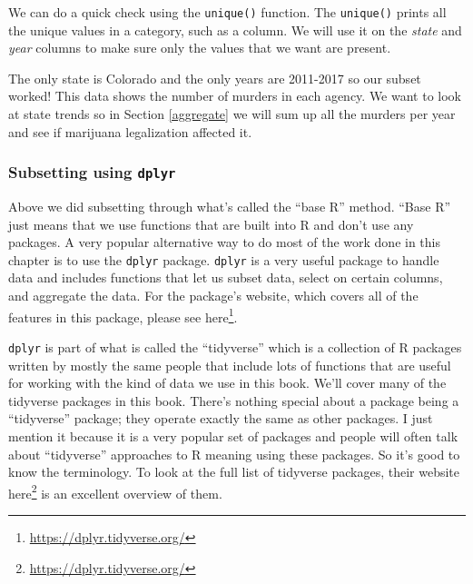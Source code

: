 \documentclass[
]{krantz}
\makeatletter
\newenvironment{Shaded}{\begin{snugshade}}{\end{snugshade}}
\newcommand{\CommentTok}[1]{\textcolor[rgb]{0.37,0.37,0.37}{\textit{#1}}}
\newcommand{\FunctionTok}[1]{\textcolor[rgb]{0,0,0}{#1}}
\newcommand{\NormalTok}[1]{#1}
\newcommand{\SpecialCharTok}[1]{\textcolor[rgb]{0,0,0}{#1}}
\renewcommand{\href}[2]{#2\footnote{\url{#1}}}
\newenvironment{kframe}{%
\medskip{}
\setlength{\fboxsep}{.8em}
 \def\at@end@of@kframe{}%
 \ifinner\ifhmode%
  \def\at@end@of@kframe{\end{minipage}}%
  \begin{minipage}{\columnwidth}%
 \fi\fi%
 \def\FrameCommand##1{\hskip\@totalleftmargin \hskip-\fboxsep
 \colorbox{shadecolor}{##1}\hskip-\fboxsep
     \hskip-\linewidth \hskip-\@totalleftmargin \hskip\columnwidth}%
 \MakeFramed {\advance\hsize-\width
   \@totalleftmargin\z@ \linewidth\hsize
   \@setminipage}}%
 {\par\unskip\endMakeFramed%
 \at@end@of@kframe}
\renewenvironment{Shaded}{\begin{kframe}}{\end{kframe}}
\makeatother
\begin{document}
We can do a quick check using the \texttt{unique()} function. The \texttt{unique()} prints all the unique values in a category, such as a column. We will use it on the \emph{state} and \emph{year} columns to make sure only the values that we want are present.

\begin{Shaded}
\end{Shaded}

\begin{Shaded}
\end{Shaded}

The only state is Colorado and the only years are 2011-2017 so our subset worked! This data shows the number of murders in each agency. We want to look at state trends so in Section \ref{aggregate} we will sum up all the murders per year and see if marijuana legalization affected it.

\hypertarget{subsetting-using-dplyr}{%
\subsubsection{\texorpdfstring{Subsetting using \texttt{dplyr}}{Subsetting using dplyr}}\label{subsetting-using-dplyr}}

Above we did subsetting through what's called the ``base R'' method. ``Base R'' just means that we use functions that are built into R and don't use any packages. A very popular alternative way to do most of the work done in this chapter is to use the \texttt{dplyr} package. \texttt{dplyr} is a very useful package to handle data and includes functions that let us subset data, select on certain columns, and aggregate the data. For the package's website, which covers all of the features in this package, please see \href{https://dplyr.tidyverse.org/}{here}.

\texttt{dplyr} is part of what is called the ``tidyverse'' which is a collection of R packages written by mostly the same people that include lots of functions that are useful for working with the kind of data we use in this book. We'll cover many of the tidyverse packages in this book. There's nothing special about a package being a ``tidyverse'' package; they operate exactly the same as other packages. I just mention it because it is a very popular set of packages and people will often talk about ``tidyverse'' approaches to R meaning using these packages. So it's good to know the terminology. To look at the full list of tidyverse packages, their website \href{https://dplyr.tidyverse.org/}{here} is an excellent overview of them.
\end{document}
